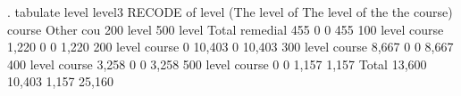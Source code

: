 . tabulate level level3
{\smallskip}
                 {\VBAR}  RECODE of level (The level of
The level of the {\VBAR}           the course)
          course {\VBAR} Other cou  200 level  500 level {\VBAR}     Total
        remedial {\VBAR}       455          0          0 {\VBAR}       455 
100 level course {\VBAR}     1,220          0          0 {\VBAR}     1,220 
200 level course {\VBAR}         0     10,403          0 {\VBAR}    10,403 
300 level course {\VBAR}     8,667          0          0 {\VBAR}     8,667 
400 level course {\VBAR}     3,258          0          0 {\VBAR}     3,258 
500 level course {\VBAR}         0          0      1,157 {\VBAR}     1,157 
           Total {\VBAR}    13,600     10,403      1,157 {\VBAR}    25,160 
{\smallskip}
